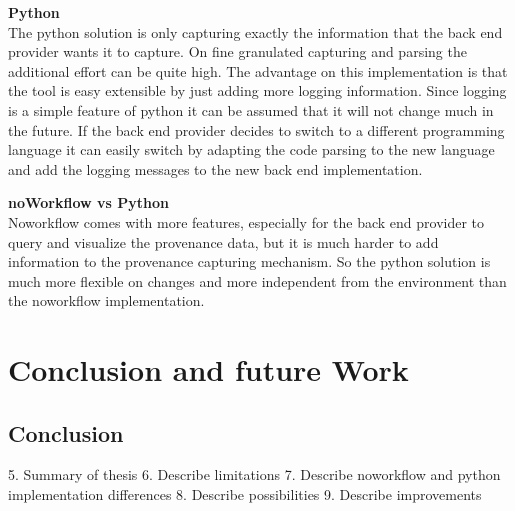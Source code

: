 \documentclass[draft,final]{vutinfth} %
\begin{document}
\textbf{Python} \\
The python solution is only capturing exactly the information that the back end provider wants it to capture. On fine granulated capturing and parsing the additional effort can be quite high. The advantage on this implementation is that the tool is easy extensible by just adding more logging information. Since logging is a simple feature of python it can be assumed that it will not change much in the future. If the back end provider decides to switch to a different programming language it can easily switch by adapting the code parsing to the new language and add the logging messages to the new back end implementation. 

\textbf{noWorkflow vs Python} \\
Noworkflow comes with more features, especially for the back end provider to query and visualize the provenance data, but it is much harder to add information to the provenance capturing mechanism. So the python solution is much more flexible on changes and more independent from the environment than the noworkflow implementation. 

\chapter{Conclusion and future Work}\label{Conclusion}

\section{Conclusion}

5.	Summary of thesis
6.	Describe limitations
7.	Describe noworkflow and python implementation differences 
8.	Describe possibilities
9.	Describe improvements
\end{document}
